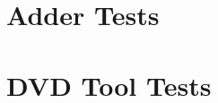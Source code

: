 %


\section{Adder Tests}
\label{Samplesaddertests}


\section{DVD Tool Tests}
\label{Samplesdvdtests}

